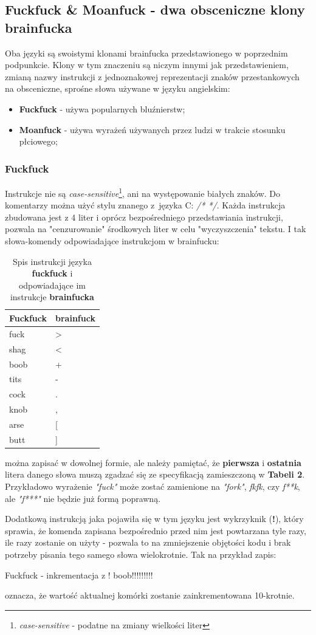 \documentclass[fleqn,10pt]{SelfArx} %
\newcommand{\tabline}{\tabularnewline\hline}
\begin{document}
\subsection{Fuckfuck \& Moanfuck - dwa obsceniczne klony brainfucka}
Oba języki są swoistymi klonami brainfucka przedstawionego w poprzednim podpunkcie. Klony w tym znaczeniu są niczym innymi jak
przedstawieniem, zmianą nazwy instrukcji z jednoznakowej reprezentacji znaków przestankowych na obsceniczne, sprośne słowa używane w języku angielskim:
\begin{itemize}
	\item \textbf{Fuckfuck} - używa popularnych bluźnierstw;
	\item \textbf{Moanfuck} - używa wyrażeń używanych przez ludzi w trakcie stosunku płciowego;
\end{itemize}

\subsubsection{Fuckfuck}
Instrukcje nie są \textit{case-sensitive}\footnote{\textit{case-sensitive} - podatne na zmiany wielkości liter},
ani na występowanie białych znaków. Do komentarzy można użyć stylu znanego z~języka C: \textit{/* */}.
Każda instrukcja zbudowana jest z 4 liter i oprócz bezpośredniego przedstawiania instrukcji, pozwala na "cenzurowanie" środkowych liter
w celu "wyczyszczenia" tekstu. I tak słowa-komendy odpowiadające instrukcjom w brainfucku:
\begin{table}[H]
	\begin{center}
		\begin{tabular}{| >{\centering}p{1.5cm} | >{\centering}p{1.5cm}|}
			\hline
			\textbf{Fuckfuck} & \textbf{brainfuck} \tabline
			fuck & > \tabline
			shag & < \tabline
			boob & + \tabline
			tits & - \tabline
			cock & . \tabline
			knob & , \tabline
			arse & [ \tabline
			butt & ] \tabline
		\end{tabular}
	\end{center}
	\caption{\centering Spis instrukcji języka \textbf{fuckfuck} i odpowiadające im instrukcje \textbf{brainfucka}}
	\label{tab:fuckfuckInstrukcje}
\end{table}

można zapisać w dowolnej formie, ale należy pamiętać, że \textbf{pierwsza} i \textbf{ostatnia} litera danego słowa muszą zgadzać się ze specyfikacją
zamieszczoną w \textbf{Tabeli 2}. Przykładowo wyrażenie \textit{"fuck"} może zostać zamienione na \textit{"fork"}, \textit{fkfk}, czy \textit{f**k}, 
ale \textit{"f***"} nie będzie już formą poprawną.\cite{esolangWiki:fuckfuck}\par
Dodatkową instrukcją jaka pojawiła się w tym języku jest wykrzyknik (\textbf{!}), który sprawia, że komenda zapisana bezpośrednio przed nim
jest powtarzana tyle razy, ile razy zostanie on użyty - pozwala to na zmniejszenie objętości kodu i brak potrzeby pisania tego samego słowa wielokrotnie.
Tak na przykład zapis:
\begin{sexylisting}{Fuckfuck - inkrementacja z !}
boob!!!!!!!!!
\end{sexylisting}
oznacza, że wartość aktualnej komórki zostanie zainkrementowana 10-krotnie.
\end{document}
